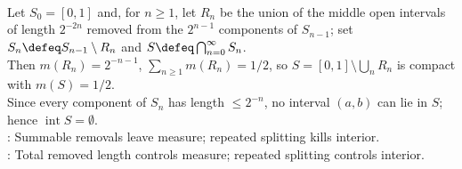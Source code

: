 \begin{example} \label{ex:fat-cantor-set-positive-measure-empty-interior} \\
Let $S_0=[0,1]$ and, for $n\geq1$, let $R_n$ be the union of the middle open intervals of length $2^{-2n}$ removed from the $2^{n-1}$ components of $S_{n-1}$; set $S_n\defeq S_{n-1}\setminus R_n$ and $S\defeq\bigcap_{n=0}^{\infty}S_n$.\\
Then $m(R_n)=2^{-n-1}$, $\sum_{n\geq1}m(R_n)=1/2$, so $S=[0,1]\setminus\bigcup_nR_n$ is compact with $m(S)=1/2$.\\
Since every component of $S_n$ has length $\leq2^{-n}$, no interval $(a,b)$ can lie in $S$; hence $\operatorname{int}S=\emptyset$.\\
: Summable removals leave measure; repeated splitting kills interior.\\
: Total removed length controls measure; repeated splitting controls interior.
\end{example}
